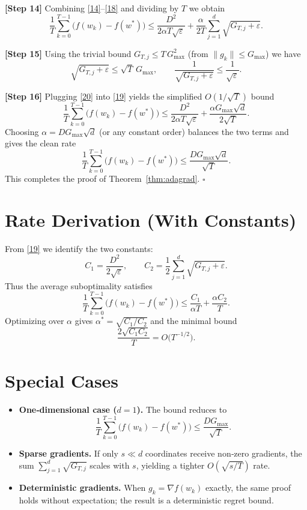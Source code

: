 \documentclass{article}
\begin{document}
\noindent\textbf{[Step 14]}  Combining \eqref{14}–\eqref{18} and dividing by $T$ we obtain
\[
\frac{1}{T}\sum_{k=0}^{T-1}\!\bigl(f(w_{k})-f(w^{*})\bigr)
   \le
   \frac{D^{2}}{2\alpha T\sqrt{\varepsilon}}
   +\frac{\alpha}{2T}\sum_{j=1}^{d}\sqrt{G_{T,j}+\varepsilon}.
\tag{19}
\]

\noindent\textbf{[Step 15]}  Using the trivial bound $G_{T,j}\le T\,G_{\max}^{2}$ (from $\|g_{k}\|\le G_{\max}$) we have
\[
\sqrt{G_{T,j}+\varepsilon}\le\sqrt{T}\,G_{\max},
\qquad
\frac{1}{\sqrt{G_{T,j}+\varepsilon}}\le\frac{1}{\sqrt{\varepsilon}} .
\tag{20}
\]

\noindent\textbf{[Step 16]}  Plugging \eqref{20} into \eqref{19} yields the simplified $O(1/\sqrt{T})$ bound
\[
\frac{1}{T}\sum_{k=0}^{T-1}\!\bigl(f(w_{k})-f(w^{*})\bigr)
   \le
   \frac{D^{2}}{2\alpha T\sqrt{\varepsilon}}
   +\frac{\alpha G_{\max}\sqrt{d}}{2\sqrt{T}} .
\tag{21}
\]
Choosing $\alpha = D G_{\max}\sqrt{d}$ (or any constant order) balances the two terms and gives the clean rate
\[
\frac{1}{T}\sum_{k=0}^{T-1}\!\bigl(f(w_{k})-f(w^{*})\bigr)
   \le \frac{D G_{\max}\sqrt{d}}{\sqrt{T}} .
\tag{22}
\]
This completes the proof of Theorem~\ref{thm:adagrad}. \hfill $\square$

\section*{Rate Derivation (With Constants)}
From \eqref{19} we identify the two constants:
\[
C_{1}= \frac{D^{2}}{2\sqrt{\varepsilon}},\qquad
C_{2}= \frac{1}{2}\sum_{j=1}^{d}\sqrt{G_{T,j}+\varepsilon}.
\]
Thus the average suboptimality satisfies
\[
\frac{1}{T}\sum_{k=0}^{T-1}\bigl(f(w_{k})-f(w^{*})\bigr)
   \le \frac{C_{1}}{\alpha T}+\frac{\alpha C_{2}}{T}.
\]
Optimizing over $\alpha$ gives $\alpha^{*}= \sqrt{C_{1}/C_{2}}$ and the minimal bound
\[
\frac{2\sqrt{C_{1}C_{2}}}{T}
   = O\!\bigl(T^{-1/2}\bigr).
\]

\section*{Special Cases}
\begin{itemize}
\item \textbf{One‑dimensional case ($d=1$).} The bound reduces to
\[
\frac{1}{T}\sum_{k=0}^{T-1}\bigl(f(w_{k})-f(w^{*})\bigr)
   \le \frac{D G_{\max}}{\sqrt{T}} .
\]
\item \textbf{Sparse gradients.} If only $s\ll d$ coordinates receive non‑zero gradients, the sum $\sum_{j=1}^{d}\sqrt{G_{T,j}}$ scales with $s$, yielding a tighter $O(\sqrt{s/T})$ rate.
\item \textbf{Deterministic gradients.} When $g_{k}=\nabla f(w_{k})$ exactly, the same proof holds without expectation; the result is a deterministic regret bound.
\end{itemize}
\end{document}
